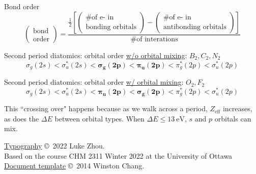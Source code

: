 \documentclass[10pt,landscape]{article}
\begin{document}
\begin{multicols}{3}
Bond order
\[
\begin{pmatrix}
	\text{bond} \\
	\text{order} 
\end{pmatrix}
= 
\frac{
	\frac{1}{2}
	\left[
		\begin{pmatrix}
			\text{\# of e- in } \\
			\text{bonding orbitals} 
		\end{pmatrix}
		-
		\begin{pmatrix}
			\text{\# of e- in } \\
			\text{antibonding orbitals} 
		\end{pmatrix}
	\right]
}{\text{\# of interations}}
\]

Second period diatomics: orbital order \underline{w/o orbital mixing}: $B_2, C_2, N_2$
\[ \sigma_g(2s) < \sigma_u^*(2s) < \mathbf{\sigma_g(2p) < \pi_u(2p)} < \pi_g^*(2p) < \sigma_u^*(2p) \]

Second period diatomics: orbital order \underline{w/ orbital mixing}: $O_2, F_2$
\[ \sigma_g(2s) < \sigma_u^*(2s) < \mathbf{\pi_u(2p) < \sigma_g(2p)} < \pi_g^*(2p) < \sigma_u^*(2p) \]

This ``crossing over" happens because as we walk across a period, $Z_\text{eff}$ increases, as does the $\Delta E$ between orbital types. When $\Delta E \leq \SI{13}{\electronvolt}$, $s$ and $p$ orbitals can mix.

\hrulefill

\scriptsize

\href{https://github.com/zhouluke/PhysicsFormulas}{Typography}  \copyright\ 2022 Luke Zhou. \\
Based on the course CHM 2311 Winter 2022 at the University of Ottawa \\
\href{http://wch.github.io/latexsheet/}{Document template}  \copyright\ 2014 Winston Chang.


\end{multicols}
\end{document}
